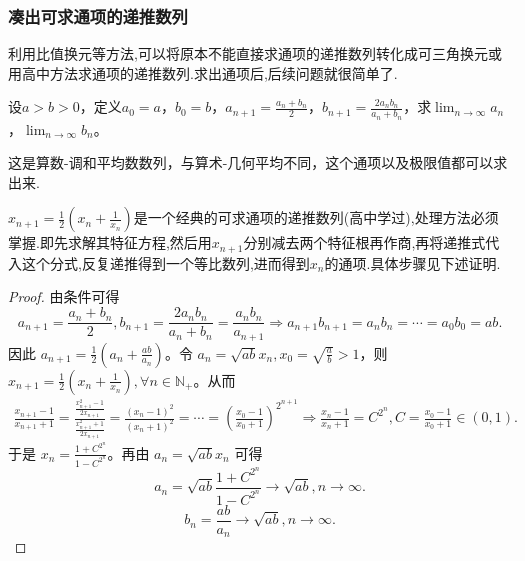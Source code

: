 \documentclass[lang=cn,newtx,10pt,scheme=chinese]{elegantbook}
\begin{document}
\subsubsection{凑出可求通项的递推数列}

利用比值换元等方法,可以将原本不能直接求通项的递推数列转化成可三角换元或用高中方法求通项的递推数列.求出通项后,后续问题就很简单了.

\begin{example}
设\(a > b>0\)，定义\(a_0 = a\)，\(b_0 = b\)，\(a_{n + 1}=\frac{a_n + b_n}{2}\)，\(b_{n + 1}=\frac{2a_nb_n}{a_n + b_n}\)，求\(\lim_{n\rightarrow\infty}a_n\)，\(\lim_{n\rightarrow\infty}b_n\)。
\end{example}
\begin{remark}
这是算数-调和平均数数列，与算术-几何平均不同，这个通项以及极限值都可以求出来.
\end{remark}\begin{note}
\(x_{n + 1}=\frac{1}{2}\left(x_n+\frac{1}{x_n}\right)\)是一个经典的可求通项的递推数列(高中学过),处理方法必须掌握.即先求解其特征方程,然后用$x_{n+1}$分别减去两个特征根再作商,再将递推式代入这个分式,反复递推得到一个等比数列,进而得到$x_n$的通项.具体步骤见下述证明.
\end{note}
\begin{proof}
由条件可得
\[
a_{n + 1}=\frac{a_n + b_n}{2},b_{n + 1}=\frac{2a_nb_n}{a_n + b_n}=\frac{a_nb_n}{a_{n + 1}}\Rightarrow a_{n + 1}b_{n + 1}=a_nb_n=\cdots =a_0b_0 = ab.
\]
因此 \(a_{n + 1}=\frac{1}{2}\left(a_n+\frac{ab}{a_n}\right)\)。令 \(a_n=\sqrt{ab}x_n,x_0=\sqrt{\frac{a}{b}}>1\)，则 \(x_{n + 1}=\frac{1}{2}\left(x_n+\frac{1}{x_n}\right),\forall n\in \mathbb{N}_+\)。从而
\begin{align*}
\frac{x_{n + 1}-1}{x_{n + 1}+1}=\frac{\frac{x_{n + 1}^2 - 1}{2x_{n + 1}}}{\frac{x_{n + 1}^2 + 1}{2x_{n + 1}}}
=\frac{(x_n - 1)^2}{(x_n + 1)^2}
=\cdots
=\left(\frac{x_0 - 1}{x_0 + 1}\right)^{2^{n + 1}}\Rightarrow \frac{x_n - 1}{x_n + 1}=C^{2^n},C=\frac{x_0 - 1}{x_0 + 1}\in(0,1).
\end{align*}
于是 \(x_n=\frac{1 + C^{2^n}}{1 - C^{2^n}}\)。再由 \(a_n=\sqrt{ab}x_n\) 可得
\[
a_n=\sqrt{ab}\frac{1 + C^{2^n}}{1 - C^{2^n}}\rightarrow\sqrt{ab},n\rightarrow\infty.
\]
\[
b_n=\frac{ab}{a_n}\rightarrow\sqrt{ab},n\rightarrow\infty.
\]
\end{proof}
\end{document}
